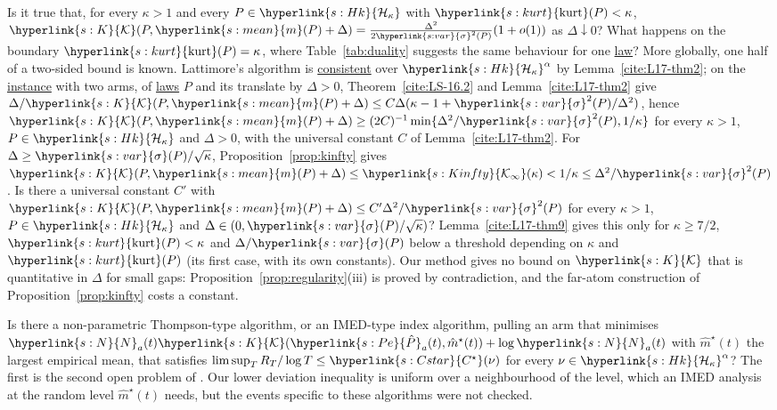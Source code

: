 \documentclass[11pt]{article}
\newcommand{\sy}[2]{{\hyperlink{#1}{#2}}}
\newcommand{\term}[2]{\hyperlink{#1}{#2}}
\newcommand{\mean}{\sy{s:mean}{m}}
\newcommand{\sd}{\sy{s:var}{\sigma}}
\newcommand{\kurt}{\sy{s:kurt}{\mathrm{kurt}}}
\newcommand{\Hk}{\sy{s:Hk}{\mathcal{H}_{\kappa}}}
\newcommand{\Kc}{\sy{s:K}{\mathcal{K}}}
\newcommand{\Kinfty}{\sy{s:Kinfty}{\mathcal{K}_{\infty}}}
\newcommand{\Np}{\sy{s:N}{N}}
\newcommand{\Pe}{\sy{s:Pe}{\hat{P}}}
\newcommand{\Cst}{\sy{s:Cstar}{C^{\star}}}
\begin{document}
\begin{openquestion}\label{oq:smallgap}
Is it true that, for every $\kappa>1$ and every $P\in\Hk$ with $\kurt(P)<\kappa$,
$\Kc(P,\mean(P)+\Delta)=\frac{\Delta^2}{2\sd^2(P)}(1+o(1))$ as $\Delta\downarrow0$? What happens on the boundary $\kurt(P)=\kappa$, where
Table~\ref{tab:duality} suggests the same behaviour for one \term{w:law}{law}? More globally, one half of a two-sided bound
is known. Lattimore's algorithm is \term{w:consistent}{consistent} over $\Hk^\alpha$ by Lemma~\ref{cite:L17-thm2}; on the
\term{w:instance}{instance} with two arms, of \term{w:law}{laws} $P$ and its translate by $\Delta>0$, Theorem~\ref{cite:LS-16.2} and
Lemma~\ref{cite:L17-thm2} give $\Delta/\Kc(P,\mean(P)+\Delta)\le C\Delta(\kappa-1+\sd^2(P)/\Delta^2)$, hence
$\Kc(P,\mean(P)+\Delta)\ge(2C)^{-1}\min\{\Delta^2/\sd^2(P),1/\kappa\}$ for every $\kappa>1$, $P\in\Hk$ and $\Delta>0$, with the universal
constant $C$ of Lemma~\ref{cite:L17-thm2}. For $\Delta\ge\sd(P)/\sqrt\kappa$, Proposition~\ref{prop:kinfty} gives
$\Kc(P,\mean(P)+\Delta)\le\Kinfty(\kappa)<1/\kappa\le\Delta^2/\sd^2(P)$. Is there a universal constant $C'$ with
$\Kc(P,\mean(P)+\Delta)\le C'\Delta^2/\sd^2(P)$ for every $\kappa>1$, $P\in\Hk$ and $\Delta\in(0,\sd(P)/\sqrt\kappa)$? Lemma~\ref{cite:L17-thm9}
gives this only for $\kappa\ge7/2$, $\kurt(P)<\kappa$ and $\Delta/\sd(P)$ below a threshold depending on $\kappa$ and $\kurt(P)$ (its
first case, with its own constants). Our method gives no bound on $\Kc$ that is
quantitative in $\Delta$ for small gaps: Proposition~\ref{prop:regularity}(iii) is proved by contradiction, and the
far-atom construction of Proposition~\ref{prop:kinfty} costs a constant.
\end{openquestion}

\begin{openquestion}\label{oq:randomised}
Is there a non-parametric Thompson-type algorithm, or an IMED-type index algorithm, pulling an arm that
minimises $\Np_a(t)\Kc(\Pe_a(t),\hat m^\star(t))+\log\Np_a(t)$ with $\hat m^\star(t)$ the largest empirical mean, that satisfies
$\limsup_TR_T/\log T\le\Cst(\nu)$ for every $\nu\in\Hk^\alpha$? The first
is the second open problem of \citet[Section~4]{L17}. Our lower deviation inequality is uniform over a
neighbourhood of the level, which an IMED analysis at the random level $\hat m^\star(t)$ needs, but the events specific
to these algorithms were not checked.
\end{openquestion}
\end{document}
